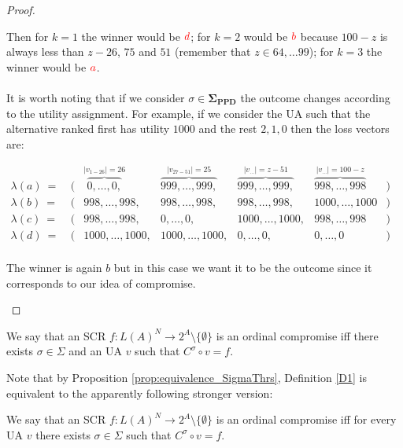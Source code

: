\documentclass[version=3.21, pagesize, notitlepage, twoside=off, bibliography=totoc, DIV=calc, fontsize=12pt, a4paper]{scrartcl}
\begin{document}
\begin{proof}
\begin{example}
	Then for $k=1$ the winner would be $\color{red}d$; for $k=2$ would be $\color{red}b$ because $100-z$ is always less than $z-26$, $75$ and $51$ (remember that $z \in {64, \dots 99}$); for $k=3$ the winner would be $\color{red}a$.
	\\\\
	It is worth noting that if we consider $\sigma \in \mathbf{\Sigma_\text{PPD}}$ the outcome changes according to the utility assignment. For example, if we consider the UA such that the alternative ranked first has utility $1000$ and the rest $2,1,0$ then the loss vectors are: 
	\begin{center}
		$
		\begin{array}{ccccccc}
		\lambda(a)\ = \ &(& \overbrace{0, \dots,0,}^{|v_{1-26}|=26} & \overbrace{999, \dots, 999,}^{|v_{27-51}|=25} & \overbrace{999, \dots, 999,}^{|v_{\dots}|=z-51} & \overbrace{998, \dots, 998}^{|v_{\dots}|=100-z} &) \\
		\lambda(b)\ = \ &(& 998, \dots,998, & 998, \dots, 998, & 998, \dots, 998, & 1000, \dots, 1000 &) \\
		\lambda(c)\ = \ &(& 998, \dots,998, & 0, \dots, 0, & 1000, \dots, 1000, & 998, \dots, 998 &) \\
		\lambda(d)\ = \ &(& 1000, \dots,1000, & 1000, \dots, 1000, & 0, \dots, 0, & 0, \dots, 0 &) \\
		\end{array}
		$
	\end{center}
	The winner is again $b$ but in this case we want it to be the outcome since it corresponds to our idea of compromise.
\end{example}

\end{proof}

\begin{definition}
\label{D1} \bigskip We say that an SCR $f:L(A)^{N}\rightarrow 2^{A} \setminus \{\emptyset \}$ is an ordinal compromise iff there exists $\sigma \in \Sigma $ and an UA $v$ such that $C^{\sigma }\circ v=f$.
\end{definition}

Note that by Proposition \ref{prop:equivalence_SigmaThrs}, Definition \ref{D1} is equivalent to the apparently following stronger version:

\begin{definition}
\label{D2} We say that an SCR $f:L(A)^{N}\rightarrow 2^{A} \setminus \{\emptyset \}$ is an ordinal compromise iff for every UA $v$ there exists $\sigma \in \Sigma $ such that $C^{\sigma }\circ v=f$.
\end{definition}
\end{document}
